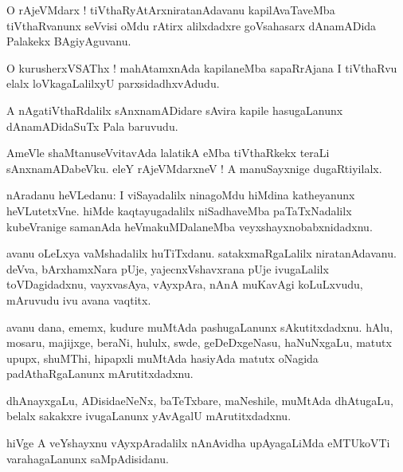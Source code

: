 \documentclass{article}
\begin{document}
\begin{mn}
O rAjeVMdarx ! tiVthaRyAtArxniratanAdavanu kapilAvaTaveMba tiVthaRvanunx  seVvisi oMdu rAtirx 
alilxdadxre goVsahasarx dAnamADida Palakekx BAgiyAguvanu.
\end{mn}

\begin{mn}
O kurusherxVSAThx ! mahAtamxnAda kapilaneMba sapaRrAjana I tiVthaRvu elalx loVkagaLalilxyU 
parxsidadhxvAdudu.
\end{mn}

\begin{mn}
A nAgatiVthaRdalilx sAnxnamADidare sAvira kapile hasugaLanunx dAnamADidaSuTx Pala baruvudu.
\end{mn}

\begin{mn}
AmeVle shaMtanuseVvitavAda lalatikA eMba tiVthaRkekx teraLi sAnxnamADabeVku. eleY rAjeVMdarxneV ! 
A manuSayxnige dugaRtiyilalx.
\end{mn}


\begin{mn}
nAradanu heVLedanu: I viSayadalilx ninagoMdu hiMdina katheyanunx heVLutetxVne. 
hiMde kaqtayugadalilx niSadhaveMba paTaTxNadalilx kubeVranige samanAda heVmakuMDalaneMba 
veyxshayxnobabxnidadxnu.
\end{mn}

\begin{mn}
avanu oLeLxya vaMshadalilx huTiTxdanu. satakxmaRgaLalilx niratanAdavanu. deVva, bArxhamxNara pUje,
yajecnxVshavxrana pUje ivugaLalilx toVDagidadxnu, vayxvasAya, vAyxpAra, nAnA muKavAgi koLuLxvudu,
mAruvudu ivu avana vaqtitx.
\end{mn}

\begin{mn}
avanu dana, ememx, kudure muMtAda pashugaLanunx sAkutitxdadxnu. hAlu, mosaru, majijxge, beraNi, 
hululx, swde, geDeDxgeNasu, haNuNxgaLu, matutx upupx, shuMThi, hipapxli muMtAda hasiyAda matutx 
oNagida padAthaRgaLanunx mArutitxdadxnu. 
\end{mn}

\begin{mn}
dhAnayxgaLu, ADisidaeNeNx, baTeTxbare, maNeshile, muMtAda dhAtugaLu, belalx sakakxre ivugaLanunx 
yAvAgalU mArutitxdadxnu.
\end{mn}

\begin{mn}
hiVge A veYshayxnu vAyxpAradalilx nAnAvidha upAyagaLiMda eMTUkoVTi varahagaLanunx saMpAdisidanu.
\end{mn}
\end{document}
